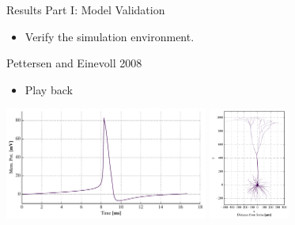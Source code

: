 \documentclass[aspectratio=169]{beamer}
\begin{document}
\begin{frame}{Results Part I: Model Validation}
    \begin{itemize}
        \item Verify the simulation environment.
    \end{itemize}
\end{frame}

\begin{frame}{Pettersen and Einevoll 2008}
    \begin{itemize}
        \item Play back
    \end{itemize}
    \begin{center}
        \includegraphics[width=0.5\textwidth]{images/cs_ap_scaled.pdf}
        \includegraphics[width=0.2\textwidth]{images/morph_xy_up.pdf}
    \end{center}
\end{frame}
\end{document}

